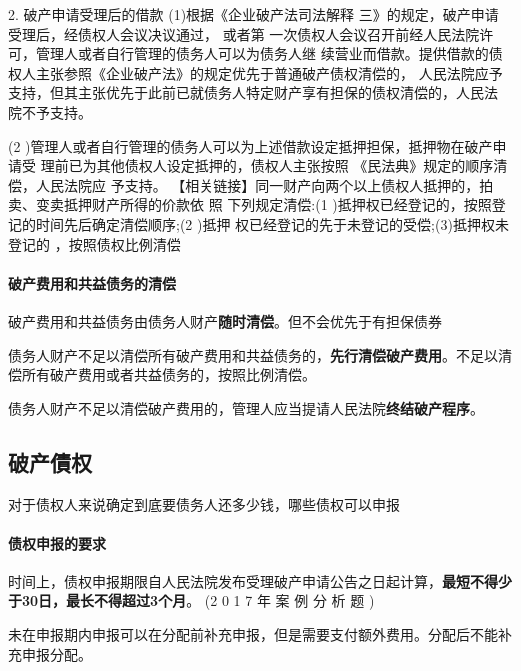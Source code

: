 \documentclass[UTF8,12pt]{ctexart}
\numberwithin{equation}{section} %
\numberwithin{figure}{section}
\numberwithin{table}{section}
\begin{document}
	2. 破产申请受理后的借款
	(1)根据《企业破产法司法解释 三》的规定，破产申请受理后，经债权人会议决议通过， 或者第 一次债权人会议召开前经人民法院许可，管理人或者自行管理的债务人可以为债务人继 续营业而借款。提供借款的债权人主张参照《企业破产法》的规定优先于普通破产债权清偿的， 人民法院应予支持，但其主张优先于此前已就债务人特定财产享有担保的债权清偿的，人民法 院不予支持。
	
	
	(2 )管理人或者自行管理的债务人可以为上述借款设定抵押担保，抵押物在破产申请受 理前已为其他债权人设定抵押的，债权人主张按照 《民法典》规定的顺序清偿，人民法院应 予支持。
	【相关链接】同一财产向两个以上债权人抵押的，拍卖、变卖抵押财产所得的价款依 照 下列规定清偿:(1 )抵押权已经登记的，按照登记的时间先后确定清偿顺序;(2 )抵押 权已经登记的先于未登记的受偿;(3)抵押权未登记的 ，按照债权比例清偿
	
	\paragraph{破产费用和共益债务的清偿}
	破产费用和共益债务由债务人财产\textbf{随时清偿}。但不会优先于有担保债券
	
	债务人财产不足以清偿所有破产费用和共益债务的，\textbf{先行清偿破产费用}。不足以清偿所有破产费用或者共益债务的，按照比例清偿。

	债务人财产不足以清偿破产费用的，管理人应当提请人民法院\textbf{终结破产程序}。
	
	
	\subsection{破产債权}
	对于债权人来说确定到底要债务人还多少钱，哪些债权可以申报
	\paragraph{债权申报的要求}
	时间上，债权申报期限自人民法院发布受理破产申请公告之日起计算，\textbf{最短不得少于30日，最长不得超过3个月}。 (2 0 1 7 年 案 例 分 析 题 )
	
	未在申报期内申报可以在分配前补充申报，但是需要支付额外费用。分配后不能补充申报分配。
	
\end{document}
